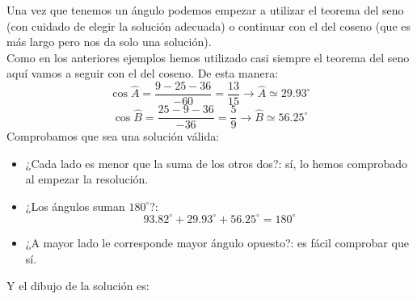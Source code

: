 \documentclass[a4paper,11pt,answers]{exam}
\newcommand{\degree}{^\circ}
\newcommand\unidad[1]{\,\text{#1}}
\begin{document}
\begin{solution}
  Una vez que tenemos un ángulo podemos empezar a utilizar el teorema del seno (con cuidado de
  elegir la solución adecuada) o continuar con el del coseno (que es más largo pero nos da solo una
  solución).\\
  Como en los anteriores ejemplos hemos utilizado casi siempre el teorema del seno aquí vamos a
  seguir con el del coseno. De esta manera:
  \[\cos \widehat{A} = \frac{9 - 25 - 36}{-60} = \frac{13}{15} \longrightarrow
    \widehat{A} \simeq 29.93\degree\]
  \[\cos \widehat{B} = \frac{25 - 9 - 36}{-36} = \frac{5}{9} \longrightarrow
    \widehat{B} \simeq 56.25\degree\]
  Comprobamos que sea una solución válida:
  \begin{itemize}
  \item ¿Cada lado es menor que la suma de los otros dos?: sí, lo hemos comprobado al empezar la
    resolución.
  \item ¿Los ángulos suman $180\degree$?: \[93.82\degree + 29.93\degree + 56.25\degree = 180\degree\]
  \item ¿A mayor lado le corresponde mayor ángulo opuesto?: es fácil comprobar que sí.
  \end{itemize}
  Y el dibujo de la solución es:
  \begin{center}
  \end{center}
\end{solution}

\newpage
\appendix
\renewcommand{\thesection}{Apendice \Alph{section}}
\end{document}
